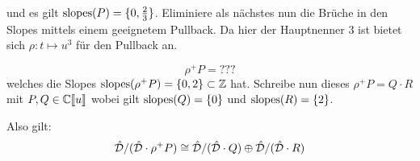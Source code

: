 und es gilt $\operatorname{slopes}(P)=\{0,\frac{2}{3}\}$. Eliminiere als nächstes nun die
Brüche in den Slopes mittels einem geeignetem Pullback. Da hier der Hauptnenner
$3$ ist bietet sich $\rho:t\mapsto u^3$ für den Pullback an.

\[ \rho^+P=??? \]
welches die Slopes $\operatorname{slopes}(\rho^+P)=\{0,2\}\subset\mathbb{Z}$ hat. Schreibe nun dieses
$\rho^+P=Q\cdot R$ mit $P,Q\in{\mathbb C\llbracket u\rrbracket}$ wobei gilt $\operatorname{slopes}(Q)=\{0\}$ und
$\operatorname{slopes}(R)=\{2\}$.

Also gilt:
\[
  \hat{\mathcal{D}}/(\hat{\mathcal{D}}\cdot\rho^+P)\cong
  \hat{\mathcal{D}}/(\hat{\mathcal{D}}\cdot Q) \oplus  \hat{\mathcal{D}}/(\hat{\mathcal{D}}\cdot R)
\]

